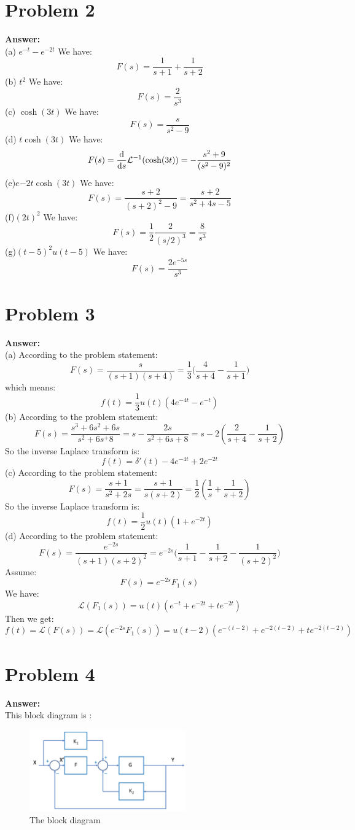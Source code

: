 \documentclass[a4paper]{article}
\begin{document}
\section{Problem 2}
{\bf Answer:}\\
(a) $e^{-t}-e^{-2t}$
We have:
$$
F(s) = \frac{1}{s+1}+\frac{1}{s+2}
$$
(b) $t^2$
We have:
$$
F(s) = \frac{2}{s^3}
$$
(c) $\cosh(3t)$
We have:
$$
F(s) = \frac{s}{s^2-9}
$$
(d) $t\cosh(3t)$
We have:
$$
F(s) = \frac{\rm d }{{\rm d}s}\mathcal{L}^{-1}(\cosh(3t)) = -\frac{s^2+9}{(s^2-9)^2}
$$
(e)$e{-2t}\cosh(3t)$
We have:
$$
F(s) = \frac{s+2}{(s+2)^2-9} = \frac{s+2}{s^2+4s-5}
$$
(f)$(2t)^2$
We have:
$$
F(s) = \frac12\frac{2}{(s/2)^3} = \frac{8}{s^3}
$$
(g)$(t-5)^2 u(t-5)$
We have:
$$
F(s) =\frac{2 e^{-5s}}{s^3}
$$

\section{Problem 3}
{\bf Answer: }\\
(a) According to the problem statement:
$$
F(s) = \frac{s}{(s+1)(s+4)} = \frac 13\Big(\frac{4}{s+4}-\frac{1}{s+1}\Big)
$$
which means:
$$
f(t) = \frac 13 u(t)(4e^{-4t}-e^{-t})
$$
(b) According to the problem statement:
$$
F(s) = \frac{s^3+6s^2+6s}{s^2+6s^+8} = s-\frac{2s}{s^2+6s+8}=s-2(\frac{2}{s+4}-\frac{1}{s+2})
$$
So the inverse Laplace transform is:
$$
f(t) = \delta'(t)-4e^{-4t}+2e^{-2t}
$$
(c) According to the problem statement:
$$
F(s) = \frac{s+1}{s^2+2s}= \frac{s+1}{s(s+2)} =\frac 12 (\frac{1}{s}+\frac{1}{s+2})
$$
So the inverse Laplace transform is:
$$
f(t) = \frac 12 u(t)(1+e^{-2t})
$$
(d)
According to the problem statement:
$$
F(s) = \frac{e^{-2s}}{(s+1)(s+2)^2} = e^{-2s}\Big(\frac{1}{s+1}-\frac{1}{s+2}-\frac{1}{(s+2)^2} \Big)
$$
Assume:
$$
F(s) = e^{-2s}F_1(s)
$$
We have:
$$
\mathcal{L}(F_1(s)) = u(t)(e^{-t}+e^{-2t}+te^{-2t})
$$
Then we get:
$$
f(t) = \mathcal{L}(F(s)) = \mathcal{L}(e^{-2s}F_1(s)) = u(t-2)(e^{-(t-2)}+e^{-2(t-2)}+te^{-2(t-2)})
$$
\section{Problem 4}
{\bf Answer: }\\
This block diagram is :
\begin{figure}[H]
\centering
\includegraphics[width=0.6\textwidth]{pic/block.jpg}
\caption{The block diagram} 
\end{figure}
\end{document}
